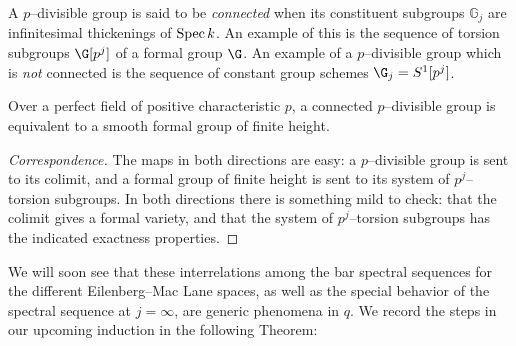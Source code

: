 \begin{definition}
A \(p\)--divisible group is said to be \textit{connected} when its constituent subgroups \(\mathbb G_j\) are infinitesimal thickenings of \(\operatorname{Spec} k\).  An example of this is the sequence of torsion subgroups \(\G[p^j]\) of a formal group \(\G\).  An example of a \(p\)--divisible group which is \emph{not} connected is the sequence of constant group schemes \(\G_j = S^1[p^j]\).
\end{definition}

\begin{lemma}
Over a perfect field of positive characteristic \(p\), a connected \(p\)--divisible group is equivalent to a smooth formal group of finite height.
\end{lemma}
\begin{proof}[Correspondence]
The maps in both directions are easy: a \(p\)--divisible group is sent to its colimit, and a formal group of finite height is sent to its system of \(p^j\)--torsion subgroups.  In both directions there is something mild to check: that the colimit gives a formal variety, and that the system of \(p^j\)--torsion subgroups has the indicated exactness properties.
\end{proof}

We will soon see that these interrelations among the bar spectral sequences for the different Eilenberg--Mac Lane spaces, as well as the special behavior of the spectral sequence at \(j = \infty\), are generic phenomena in \(q\).  We record the steps in our upcoming induction in the following Theorem:

